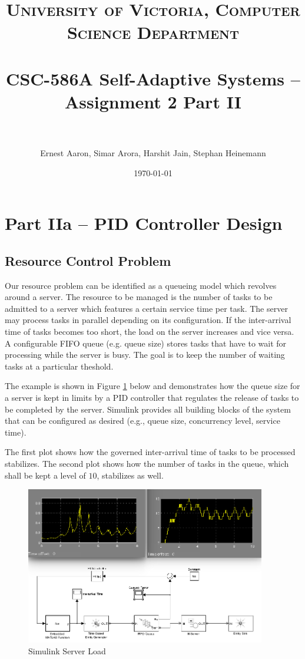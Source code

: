 \documentclass[paper=letter, fontsize=11pt]{scrartcl}
\title{	
\normalfont \normalsize 
\textsc{University of Victoria, Computer Science Department} \\ [25pt]
\horrule{0.5pt} \\[0.4cm]
\huge CSC-586A Self-Adaptive Systems -- Assignment 2 Part II \\
\horrule{2pt} \\[0.5cm]
}
\author{Ernest Aaron, Simar Arora, Harshit Jain, Stephan Heinemann}
\date{\normalsize\today}
\numberwithin{equation}{section}
\numberwithin{figure}{section}
\numberwithin{table}{section}
\begin{document}
\maketitle

\clearpage
\section{Part IIa -- \acs{PID} Controller Design}
\label{sec:part2}

\subsection{Resource Control Problem}
\label{sec:resource_control_problem}
\par
Our resource problem can be identified as a queueing model which revolves around
a server. The resource to be managed is the number of tasks to be admitted to
a server which features a certain service time per task. The server may process
tasks in parallel depending on its configuration. If the inter-arrival time of
tasks becomes too short, the load on the server increases and vice versa.
A configurable \ac{FIFO} queue (e.g. queue size) stores tasks that have to wait
for processing while the server is busy. The goal is to keep the number of
waiting tasks at a particular theshold.
\newline
\par
The example is shown in Figure \ref{fig:simulink-server} below and demonstrates
how the queue size for a server is kept in limits by a \ac{PID} controller
that regulates the release of tasks to be completed by the server. Simulink
provides all building blocks of the system that can be configured as desired
(e.g., queue size, concurrency level, service time).
\newline
\par
The first plot shows how the governed inter-arrival time of tasks to be
processed stabilizes. The second plot shows how the number of tasks in the
queue, which shall be kept a level of $10$, stabilizes as well.

\begin{figure}[h]
	\centering
	\includegraphics[height=260px]{graphics/simulink-server}
	\caption{Simulink Server Load}
	\label{fig:simulink-server}
\end{figure}
\end{document}
